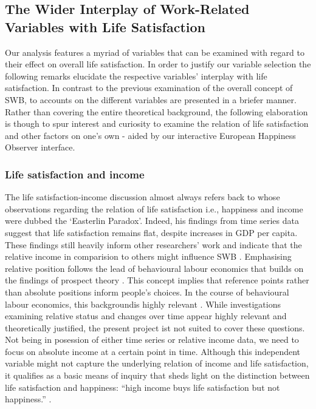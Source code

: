 \documentclass[preprint,12pt,authoryear]{elsarticle}
\begin{document}
	\subsection{The Wider Interplay of Work-Related Variables with Life Satisfaction}
Our analysis features a myriad of variables that can be examined with regard to their effect on overall life satisfaction.
In order to justify our variable selection the following remarks elucidate the respective variables' interplay with life satisfaction.
In contrast to the previous examination of the overall concept of SWB, to accounts on the different variables are presented 
in a briefer manner. Rather than covering the entire theoretical background, the following elaboration is though to spur interest
and curiosity to examine the relation of life satisfaction and other factors on one's own - aided by our interactive 
European Happiness Observer interface. 

\subsubsection{Life satisfaction and income}
The life satisfaction-income discussion almost always refers back to \citet{easterlin_does_1974} whose observations regarding
the relation of life satisfaction i.e., happiness and income were dubbed the `Easterlin Paradox'. Indeed, his findings from time series data
suggest that life satisfaction remains flat, despite increases in GDP per capita. These findings still heavily inform other researchers'
work and indicate that the relative income in comparision to others might influence SWB \citep{di_tella_happiness_2010,drichoutis_reference_2010,pedersen_happiness_2011}.
Emphasising relative position follows the lead of behavioural labour economics that builds on the findings of prospect theory \citep{kahneman_prospect_1979}.
This concept implies that reference points rather than absolute positions inform people's choices. In the course of behavioural
labour economics, this backgroundis highly relevant \citep{dohmen_behavioral_2014}. 
While investigations examining relative status and changes over time appear highly relevant and theoretically justified, the present
project ist not suited to cover these questions. Not being in posession of either time series or relative income data, we need
to focus on absolute income at a certain point in time. Although this independent variable might not capture the underlying relation
of income and life satisfaction, it qualifies as a basic means of inquiry that sheds light on the distinction between life satisfaction
and happiness: “high income buys life satisfaction but not happiness.” \citep[p. 16489]{kahneman_high_2010}. 
\end{document}
